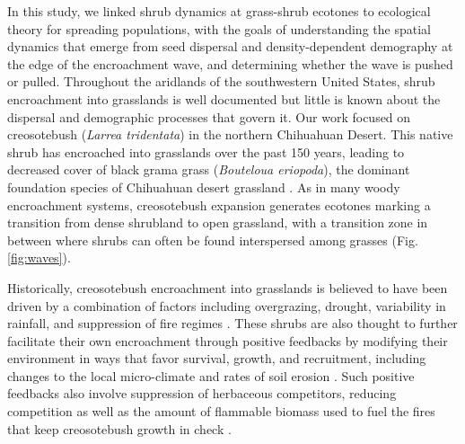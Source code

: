 \documentclass[11pt]{article}\usepackage[]{graphicx}\usepackage[usenames,dvipsnames]{xcolor}
\begin{document}
In this study, we linked shrub dynamics at grass-shrub ecotones to ecological theory for spreading populations, with the goals of understanding the spatial dynamics that emerge from seed dispersal and density-dependent demography at the edge of the encroachment wave, and determining whether the  wave is pushed or pulled.
Throughout the aridlands of the southwestern United States, shrub encroachment into grasslands is well documented \citep{d2012synthetic} but little is known about the dispersal and demographic processes that govern it. 
Our work focused on creosotebush (\textit{Larrea tridentata}) in the northern Chihuahuan Desert. 
This native shrub has encroached into grasslands over the past 150 years, leading to decreased cover of black grama grass (\textit{Bouteloua eriopoda}), the dominant foundation species of Chihuahuan desert grassland \citep{gardner1951vegetation, buffington1965vegetational, gibbens2005vegetation}.
As in many woody encroachment systems, creosotebush expansion generates ecotones marking a transition from dense shrubland to open grassland, with a transition zone in between where shrubs can often be found interspersed among grasses (Fig. \ref{fig:waves}).

Historically, creosotebush encroachment into grasslands is believed to have been driven by a combination of factors including overgrazing, drought, variability in rainfall, and suppression of fire regimes \citep{moreno2016seed}.
These shrubs are also thought to further facilitate their own encroachment through positive feedbacks \citep{grover1990shrubland, d2012synthetic} by modifying their environment in ways that favor survival, growth, and recruitment, including changes to the local micro-climate \citep{d2010positive} and rates of soil erosion \citep{turnbull2010changes}.
Such positive feedbacks also involve suppression of herbaceous competitors, reducing competition as well as the amount of flammable biomass used to fuel the fires that keep creosotebush growth in check \citep{van2000shrub}.
\end{document}
